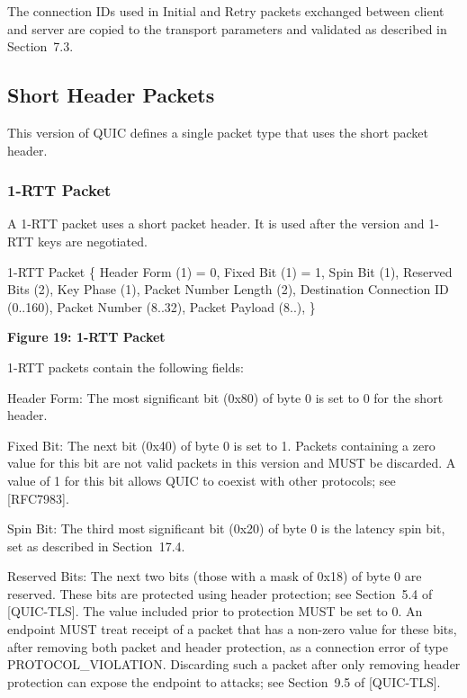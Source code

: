 \documentclass{article}
\begin{document}
The connection IDs used in Initial and Retry packets exchanged between client and server are copied to the transport parameters and validated as described in Section~7.3.

\subsection{Short Header Packets}

This version of QUIC defines a single packet type that uses the short packet header.

\subsubsection{1-RTT Packet}

A 1-RTT packet uses a short packet header.  It is used after the version and 1-RTT keys are negotiated.

1-RTT Packet \{ Header Form (1) = 0, Fixed Bit (1) = 1, Spin Bit (1), Reserved Bits (2), Key Phase (1), Packet Number Length (2), Destination Connection ID (0..160), Packet Number (8..32), Packet Payload (8..), \}

\begin{center}
\textbf{Figure 19: 1-RTT Packet}
\end{center}

1-RTT packets contain the following fields:

Header Form:  The most significant bit (0x80) of byte 0 is set to 0 for the short header.

Fixed Bit:  The next bit (0x40) of byte 0 is set to 1.  Packets containing a zero value for this bit are not valid packets in this version and MUST be discarded.  A value of 1 for this bit allows QUIC to coexist with other protocols; see [RFC7983].

Spin Bit:  The third most significant bit (0x20) of byte 0 is the latency spin bit, set as described in Section~17.4.

Reserved Bits:  The next two bits (those with a mask of 0x18) of byte 0 are reserved.  These bits are protected using header protection; see Section~5.4 of [QUIC-TLS].  The value included prior to protection MUST be set to 0.  An endpoint MUST treat receipt of a packet that has a non-zero value for these bits, after removing both packet and header protection, as a connection error of type PROTOCOL\_VIOLATION.  Discarding such a packet after only removing header protection can expose the endpoint to attacks; see Section~9.5 of [QUIC-TLS].
\end{document}
